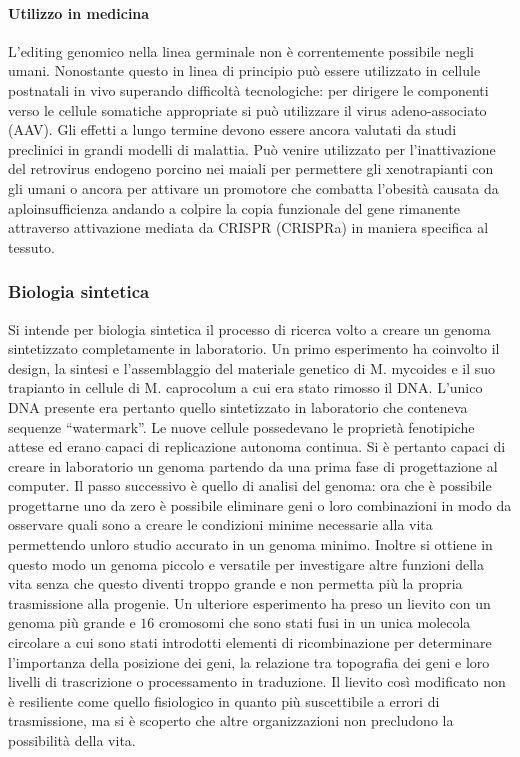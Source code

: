 			\paragraph{Utilizzo in medicina}
			L'editing genomico nella linea germinale non \`e correntemente possibile negli umani. 
			Nonostante questo in linea di principio pu\`o essere utilizzato in cellule postnatali in vivo superando difficolt\`a tecnologiche: per dirigere le componenti verso le cellule somatiche appropriate si pu\`o utilizzare il virus adeno-associato (AAV). 
			Gli effetti a lungo termine devono essere ancora valutati da studi preclinici in grandi modelli di malattia. 
			Pu\`o venire utilizzato per l'inattivazione del retrovirus endogeno porcino nei maiali per permettere gli xenotrapianti con gli umani o ancora per attivare un promotore che combatta l'obesit\`a causata da aploinsufficienza andando a colpire la copia funzionale del gene rimanente attraverso attivazione mediata da CRISPR (CRISPRa) in maniera specifica al tessuto. 

		\subsubsection{Biologia sintetica}
		Si intende per biologia sintetica il processo di ricerca volto a creare un genoma sintetizzato completamente in laboratorio. 
		Un primo esperimento ha coinvolto il design, la sintesi e l'assemblaggio del materiale genetico di M. mycoides e il suo trapianto in cellule di M. caprocolum a cui era stato rimosso il DNA. 
		L'unico DNA presente era pertanto quello sintetizzato in laboratorio che conteneva sequenze ``watermark''. 
		Le nuove cellule possedevano le propriet\`a fenotipiche attese ed erano capaci di replicazione autonoma continua. 
		Si \`e pertanto capaci di creare in laboratorio un genoma partendo da una prima fase di progettazione al computer. 
		Il passo successivo \`e quello di analisi del genoma: ora che \`e possibile progettarne uno da zero \`e possibile eliminare geni o loro combinazioni in modo da osservare quali sono a creare le condizioni minime necessarie alla vita permettendo unloro studio accurato in un genoma minimo. 
		Inoltre si ottiene in questo modo un genoma piccolo e versatile per investigare altre funzioni della vita senza che questo diventi troppo grande e non permetta pi\`u la propria trasmissione alla progenie. 
		Un ulteriore esperimento ha preso un lievito con un genoma pi\`u grande e $16$ cromosomi che sono stati fusi in un unica molecola circolare a cui sono stati introdotti elementi di ricombinazione per determinare l'importanza della posizione dei geni, la relazione tra topografia dei geni e loro livelli di trascrizione o processamento in traduzione. 
		Il lievito cos\`i modificato non \`e resiliente come quello fisiologico in quanto pi\`u suscettibile a errori di trasmissione, ma si \`e scoperto che altre organizzazioni non precludono la possibilit\`a della vita. 

